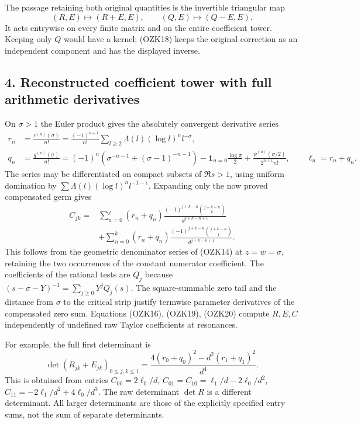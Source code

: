 \documentclass[
  10pt,
  a4paper,
]{article}
\begin{document}
The passage retaining both original quantities is the invertible
triangular map \[
(R,E)\longmapsto(R+E,E),\qquad
(Q,E)\longmapsto(Q-E,E).
\tag{OZK18}
\] It acts entrywise on every finite matrix and on the entire
coefficient tower. Keeping only \(Q\) would have a kernel; (OZK18) keeps
the original correction as an independent component and has the
displayed inverse.

\subsection{4. Reconstructed coefficient tower with full arithmetic
derivatives}\label{reconstructed-coefficient-tower-with-full-arithmetic-derivatives}

On \(\sigma>1\) the Euler product gives the absolutely convergent
derivative series \[
\begin{aligned}
r_n&=\frac{r^{(n)}(\sigma)}{n!}
=\frac{(-1)^{n+1}}{n!}\sum_{l\ge2}\Lambda(l)(\log l)^n l^{-\sigma},\\
q_n&=\frac{q^{(n)}(\sigma)}{n!}
=(-1)^n\left(\sigma^{-n-1}+(\sigma-1)^{-n-1}\right)
-\mathbf1_{n=0}\frac{\log\pi}{2}
+\frac{\psi^{(n)}(\sigma/2)}{2^{n+1}n!},\qquad \ell_n=r_n+q_n.
\end{aligned}\tag{OZK19}
\] The series may be differentiated on compact subsets of \(\Re s>1\),
using uniform domination by
\(\sum\Lambda(l)(\log l)^n l^{-1-\epsilon}\). Expanding only the now
proved compensated germ gives \[
\begin{aligned}
C_{jk}={}&\sum_{n=0}^{j}(r_n+q_n)
\frac{(-1)^{j+k-n}\binom{j+k-n}{k}}{d^{j+k-n+1}}\\
&+\sum_{n=0}^{k}(r_n+q_n)
\frac{(-1)^{j+k-n}\binom{j+k-n}{j}}{d^{j+k-n+1}}.
\end{aligned}\tag{OZK20}
\] This follows from the geometric denominator series of (OZK14) at
\(z=w=\sigma\), retaining the two occurrences of the constant numerator
coefficient. The coefficients of the rational tests are \(Q_j\) because
\((s-\sigma-Y)^{-1}=\sum_{j\ge0}Y^jQ_j(s)\). The square-summable zero
tail and the distance from \(\sigma\) to the critical strip justify
termwise parameter derivatives of the compensated zero sum. Equations
(OZK16), (OZK19), (OZK20) compute \(R,E,C\) independently of undefined
raw Taylor coefficients at resonances.

For example, the full first determinant is \[
\det(R_{jk}+E_{jk})_{0\le j,k\le1}
=\frac{4(r_0+q_0)^2-d^2(r_1+q_1)^2}{d^4}.
\tag{OZK21}
\] This is obtained from entries \(C_{00}=2\ell_0/d\),
\(C_{01}=C_{10}=\ell_1/d-2\ell_0/d^2\),
\(C_{11}=-2\ell_1/d^2+4\ell_0/d^3\). The raw determinant \(\det R\) is a
different determinant. All larger determinants are those of the
explicitly specified entry sums, not the sum of separate determinants.
\end{document}
